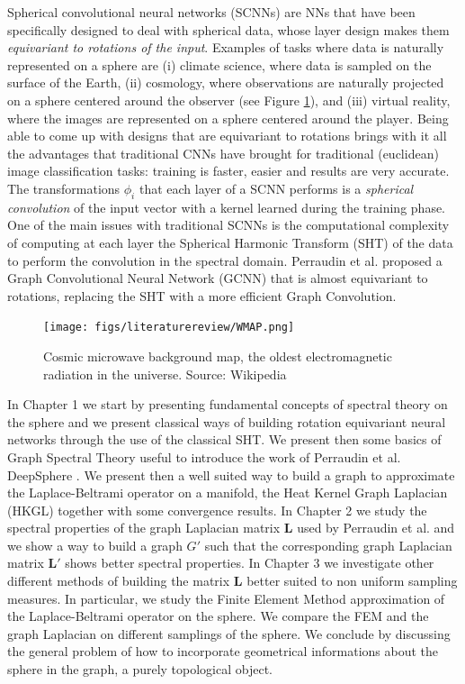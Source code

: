 Spherical convolutional neural networks (SCNNs) are NNs that have been specifically designed to deal with spherical data, whose layer design makes them \textit{equivariant to rotations of the input}.  Examples of tasks where data is naturally represented on a sphere are (i) climate science, where data is sampled on the surface of the Earth, (ii) cosmology, where observations are naturally projected on a sphere centered around the observer (see Figure \ref{fig:cosmicradiation}), and (iii) virtual reality, where the images are represented on a sphere centered around the player. Being able to come up with designs that are equivariant to rotations brings with it all the advantages that traditional CNNs have brought for traditional (euclidean) image classification tasks: training is faster, easier and results are very accurate. The transformations $\phi_i$ that each layer of a SCNN performs is a \textit{spherical convolution} of the input vector with a kernel learned during the training phase. One of the main issues with traditional SCNNs is the computational complexity of computing at each layer the Spherical Harmonic Transform (SHT) of the data to perform the convolution in the spectral domain. Perraudin et al. \cite{DeepSphere} proposed a Graph Convolutional Neural Network (GCNN) that is almost equivariant to rotations, replacing the SHT with a more efficient Graph Convolution.
\begin{figure}
	\centering
	\caption{\label{fig:cosmicradiation} Cosmic microwave background map, the oldest electromagnetic radiation in the universe. Source: Wikipedia}
	\texttt{[image: figs/literaturereview/WMAP.png]}
\end{figure}

In Chapter 1 we start by presenting fundamental concepts of spectral theory on the sphere and we present classical ways of building rotation equivariant neural networks through the use of the classical SHT.  We present then some basics of Graph Spectral Theory useful to introduce the work of Perraudin et al. DeepSphere \cite{DeepSphere}. We present then a well suited way to build a graph to approximate the Laplace-Beltrami operator on a manifold, the Heat Kernel Graph Laplacian (HKGL) together with some convergence results. In Chapter 2 we study the spectral properties of the graph Laplacian matrix $\mathbf L$ used by Perraudin et al. and we show a way to build a graph $G'$ such that the corresponding graph Laplacian matrix $\mathbf L'$ shows better spectral properties. In Chapter 3 we investigate other different methods of building the matrix $\mathbf L$ better suited to non uniform sampling measures. In particular, we study the Finite Element Method approximation of the Laplace-Beltrami operator on the sphere. We compare the FEM and the graph Laplacian on different samplings of the sphere. We conclude by discussing the general problem of how to incorporate geometrical informations about the sphere in the graph, a purely topological object.

